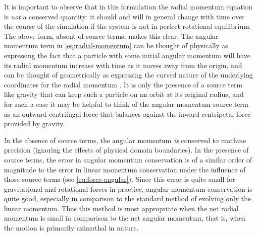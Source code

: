 \documentclass[12pt]{article}
\begin{document}
It is important to observe that in this formulation the radial momentum equation
is \textit{not} a conserved quantity: it should and will in general change with
time over the course of the simulation if the system is not in perfect rotational
equilibrium. The above form, absent of source terms, makes this clear. The angular momentum term in
\autoref{eq:radial-momentum} can be thought of physically as expressing the fact
that a particle with some initial angular momentum will have its radial momentum
increase with time as it moves away from the origin, and can be thought of geometrically
as expressing the curved nature of the underlying coordinates for the radial momentum
\citep{motl:2002}. It is only the presence of a source term like gravity that can keep
such a particle on an orbit at its original radius, and for such a case it may be helpful
to think of the angular momentum source term as an outward centrifugal force that
balances against the inward centripetal force provided by gravity.

In the absence of source terms, the angular momentum \textit{is} conserved
to machine precision (ignoring the effects of physical domain boundaries). In the
presence of source terms, the error in angular momentum conservation is of a
similar order of magnitude to the error in linear momentum conservation under
the influence of those source terms (see \autoref{eq:force-angular}). Since this
error is quite small for gravitational and rotational forces in practice, angular
momentum conservation is quite good, especially in comparison to the standard
method of evolving only the linear momentum. Thus this method is most appropriate
when the net radial momentum is small in comparison to the net angular momentum,
that is, when the motion is primarily azimuthal in nature.
\end{document}
